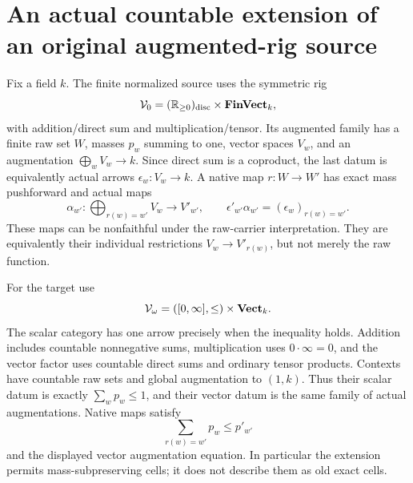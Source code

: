 \documentclass[11pt]{article}
\begin{document}
\section{An actual countable extension of an original augmented-rig source}
Fix a field $k$. The finite normalized source uses the symmetric rig
\[
 \mathcal V_0=(\mathbb R_{\geq0})_{\rm disc}\times\mathbf{FinVect}_k,
\]
with addition/direct sum and multiplication/tensor. Its augmented family has a finite raw set $W$, masses $p_w$ summing to one, vector spaces $V_w$, and an augmentation $\bigoplus_wV_w\to k$. Since direct sum is a coproduct, the last datum is equivalently actual arrows $\epsilon_w:V_w\to k$. A native map $r:W\to W'$ has exact mass pushforward and actual maps
\[
 \alpha_{w'}:\bigoplus_{r(w)=w'}V_w\longrightarrow V'_{w'},
 \qquad \epsilon'_{w'}\alpha_{w'}=(\epsilon_w)_{r(w)=w'}.
\]
These maps can be nonfaithful under the raw-carrier interpretation. They are equivalently their individual restrictions $V_w\to V'_{r(w)}$, but not merely the raw function.

For the target use
\[
 \mathcal V_\omega=([0,\infty],\leq)\times\mathbf{Vect}_k.
\]
The scalar category has one arrow precisely when the inequality holds. Addition includes countable nonnegative sums, multiplication uses $0\cdot\infty=0$, and the vector factor uses countable direct sums and ordinary tensor products. Contexts have countable raw sets and global augmentation to $(1,k)$. Thus their scalar datum is exactly $\sum_wp_w\leq1$, and their vector datum is the same family of actual augmentations. Native maps satisfy
\[
 \sum_{r(w)=w'}p_w\leq p'_{w'}
\]
and the displayed vector augmentation equation. In particular the extension permits mass-subpreserving cells; it does not describe them as old exact cells.
\end{document}
